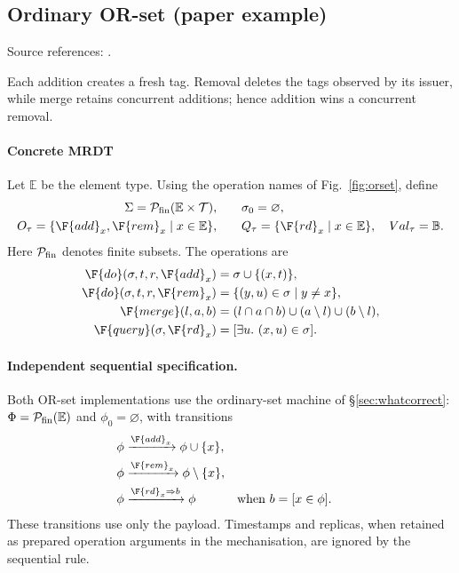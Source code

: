 \subsection{Ordinary OR-set (paper example)}
\label{app:dt-ordinary-or-set-paper-example}

\noindent Source references: \cite{neem}.


Each addition creates a fresh tag. Removal deletes the tags observed by its issuer, while merge retains concurrent additions; hence addition wins a concurrent removal.

\paragraph{Concrete MRDT}
Let $\mathbb E$ be the element type. Using the operation names of
Fig.~\ref{fig:orset}, define
\[
\begin{aligned}
\Sigma=\mathcal P_{\rm fin}(\mathbb E\times\mathcal T),\qquad &\sigma_0=\varnothing,\\
O_\tau=\{\F{add}_x,\F{rem}_x\mid x\in\mathbb E\},\qquad
&Q_\tau=\{\F{rd}_x\mid x\in\mathbb E\},\quad Val_\tau=\mathbb B.
\end{aligned}
\]
Here $\mathcal P_{\rm fin}$ denotes finite subsets. The operations are
\[
\begin{aligned}
\F{do}(\sigma,t,r,\F{add}_x)&=\sigma\cup\{(x,t)\},\\
\F{do}(\sigma,t,r,\F{rem}_x)&=\{(y,u)\in\sigma\mid y\ne x\},\\
\F{merge}(l,a,b)&=(l\cap a\cap b)\cup(a\setminus l)\cup(b\setminus l),\\
\F{query}(\sigma,\F{rd}_x)&=[\exists u.\ (x,u)\in\sigma].
\end{aligned}
\]

\paragraph{Independent sequential specification.}
Both OR-set implementations use the ordinary-set machine of
\S\ref{sec:whatcorrect}: $\Phi=\mathcal P_{\rm fin}(\mathbb E)$ and
$\phi_0=\varnothing$, with transitions
\[
\begin{aligned}
\phi&\xrightarrow{\F{add}_x}\phi\cup\{x\},\\
\phi&\xrightarrow{\F{rem}_x}\phi\setminus\{x\},\\
\phi&\xrightarrow{\F{rd}_x\Rightarrow b}\phi
  &&\text{when }b=[x\in\phi].
\end{aligned}
\]
These transitions use only the payload. Timestamps and replicas, when
retained as prepared operation arguments in the mechanisation, are ignored
by the sequential rule.

